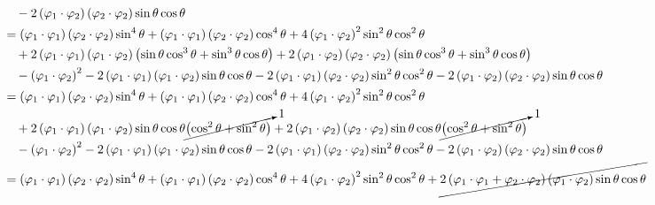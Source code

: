 \documentclass{article}[a4]
\begin{document}
\begin{align*}
    & \quad - 2 \left( \varphi_1\cdot\varphi_2 \right) \left( \varphi_2\cdot\varphi_2 \right) \sin \theta \cos \theta \\
    &= \left( \varphi_1\cdot\varphi_1 \right) \left( \varphi_2\cdot\varphi_2 \right) \sin^4 \theta + \left( \varphi_1\cdot\varphi_1 \right) \left( \varphi_2\cdot\varphi_2 \right) \cos^4 \theta + 4 \left( \varphi_1\cdot\varphi_2 \right)^2 \sin^2 \theta \cos^2 \theta \\
    & \quad + 2 \left( \varphi_1\cdot\varphi_1 \right) \left( \varphi_1\cdot\varphi_2 \right) \left( \sin \theta \cos^3 \theta + \sin^3 \theta \cos \theta \right) + 2 \left( \varphi_1\cdot\varphi_2 \right) \left( \varphi_2\cdot\varphi_2 \right) \left( \sin \theta \cos^3 \theta + \sin^3 \theta \cos \theta \right) \\
    & \quad  - \left( \varphi_1\cdot\varphi_2 \right)^2 - 2 \left( \varphi_1\cdot\varphi_1 \right) \left( \varphi_1\cdot\varphi_2 \right) \sin \theta \cos \theta - 2 \left( \varphi_1\cdot\varphi_1 \right) \left( \varphi_2\cdot\varphi_2 \right) \sin^2 \theta \cos^2 \theta - 2 \left( \varphi_1\cdot\varphi_2 \right) \left( \varphi_2\cdot\varphi_2 \right) \sin \theta \cos \theta \\
    &= \left( \varphi_1\cdot\varphi_1 \right) \left( \varphi_2\cdot\varphi_2 \right) \sin^4 \theta + \left( \varphi_1\cdot\varphi_1 \right) \left( \varphi_2\cdot\varphi_2 \right) \cos^4 \theta + 4 \left( \varphi_1\cdot\varphi_2 \right)^2 \sin^2 \theta \cos^2 \theta \\
    & \quad + 2 \left( \varphi_1\cdot\varphi_1 \right) \left( \varphi_1\cdot\varphi_2 \right) \sin \theta \cos \theta \cancelto{1}{\left( \cos^2 \theta + \sin^2 \theta \right)} + 2 \left( \varphi_1\cdot\varphi_2 \right) \left( \varphi_2\cdot\varphi_2 \right) \sin \theta \cos \theta \cancelto{1}{\left( \cos^2 \theta + \sin^2 \theta \right)} \\
    & \quad  - \left( \varphi_1\cdot\varphi_2 \right)^2 - 2 \left( \varphi_1\cdot\varphi_1 \right) \left( \varphi_1\cdot\varphi_2 \right) \sin \theta \cos \theta - 2 \left( \varphi_1\cdot\varphi_1 \right) \left( \varphi_2\cdot\varphi_2 \right) \sin^2 \theta \cos^2 \theta - 2 \left( \varphi_1\cdot\varphi_2 \right) \left( \varphi_2\cdot\varphi_2 \right) \sin \theta \cos \theta \\
    &= \left( \varphi_1\cdot\varphi_1 \right) \left( \varphi_2\cdot\varphi_2 \right) \sin^4 \theta + \left( \varphi_1\cdot\varphi_1 \right) \left( \varphi_2\cdot\varphi_2 \right) \cos^4 \theta + 4 \left( \varphi_1\cdot\varphi_2 \right)^2 \sin^2 \theta \cos^2 \theta + \cancel{2 \left( \varphi_1\cdot\varphi_1 + \varphi_2\cdot\varphi_2 \right) \left( \varphi_1\cdot\varphi_2 \right) \sin \theta \cos \theta} \\

\end{align*}
\end{document}
